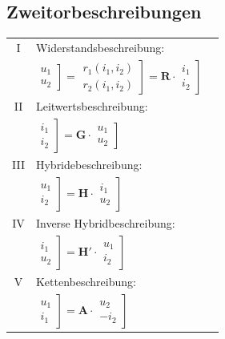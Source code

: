 \documentclass[6pt,a4paper]{scrartcl}
\newcommand{\ma}[1]{\ensuremath{{\boldsymbol {#1}}}}
\begin{document}
\begin{multicols}{3}
	\subsection{Zweitorbeschreibungen}
	\begin{tabular}{cll}
	I & Widerstandsbeschreibung:\\
	& $\left.\begin{matrix} u_1\\ u_2\end{matrix}\right]=\left.\begin{matrix} r_1(i_1,i_2)\\ r_2(i_1,i_2) \end{matrix}\right] = \ma{R} \cdot \left.\begin{matrix} i_1\\ i_2 \end{matrix}\right]$\\
	II & Leitwertsbeschreibung:\\
	& $\left.\begin{matrix} i_1\\ i_2\end{matrix}\right]=\ma{G} \cdot \left.\begin{matrix} u_1\\ u_2 \end{matrix}\right]$\\
	III & Hybridebeschreibung:\\
	& $\left.\begin{matrix} u_1\\ i_2\end{matrix}\right]=\ma{H} \cdot \left.\begin{matrix} i_1\\ u_2 \end{matrix}\right]$\\
	IV & Inverse Hybridbeschreibung:\\
	& $\left.\begin{matrix} i_1\\ u_2\end{matrix}\right]=\ma{H'} \cdot \left.\begin{matrix} u_1\\ i_2 \end{matrix}\right]$\\
	V & Kettenbeschreibung:\\
	& $\left.\begin{matrix} u_1\\ i_1\end{matrix}\right]=\ma{A} \cdot \left.\begin{matrix} u_2\\ -i_2 \end{matrix}\right]$\\

\end{tabular}
\end{multicols}
\end{document}
